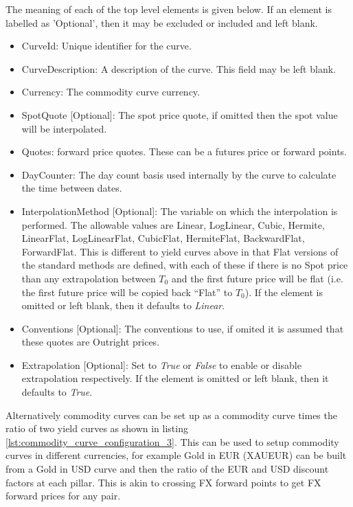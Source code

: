 The meaning of each of the top level elements is given below. If an element is labelled
as 'Optional', then it may be excluded or included and left blank.
\begin{itemize}
\item CurveId: Unique identifier for the curve.
\item CurveDescription: A description of the curve. This field may be left blank.
\item Currency: The commodity curve currency.
\item SpotQuote [Optional]: The spot price quote, if omitted then the spot value will be interpolated.
\item Quotes: forward price quotes. These can be a futures price or forward points.
\item DayCounter: The day count basis used internally by the curve to calculate the time between dates.
\item InterpolationMethod [Optional]: The variable on which the interpolation is performed. The allowable values are
Linear, LogLinear, Cubic, Hermite, LinearFlat, LogLinearFlat, CubicFlat, HermiteFlat, BackwardFlat, ForwardFlat. This is different to yield curves above in that Flat versions
of the standard methods are defined, with each of these if there is no Spot price than any extrapolation between $T_0$ and the
first future price will be flat (i.e. the first future price will be copied back ``Flat'' to $T_0$).
If the element is omitted or left blank, then it defaults to \emph{Linear}.
\item Conventions [Optional]: The conventions to use, if omited it is assumed that these quotes are Outright prices.
\item Extrapolation [Optional]: Set to \emph{True} or \emph{False} to enable or disable extrapolation respectively. If
the element is omitted or left blank, then it defaults to \emph{True}.
\end{itemize}



Alternatively commodity curves can be set up as a commodity curve times the ratio of two yield curves as shown in listing
\ref{lst:commodity_curve_configuration_3}. This can be used to setup commodity curves in different currencies, for example Gold in EUR (XAUEUR) can be built from a Gold in USD curve and then the ratio of the EUR and USD discount factors at each pillar. This is akin to crossing FX forward points to get FX forward prices for any pair.

